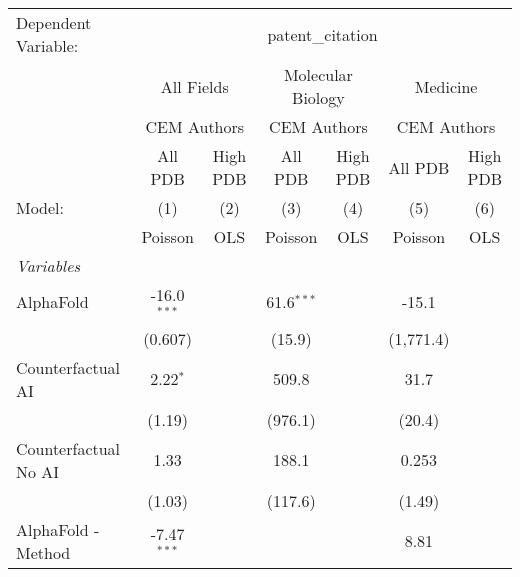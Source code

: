 \begingroup
\centering
\begin{tabular}{lcccccc}
   \tabularnewline \midrule \midrule
   Dependent Variable: & \multicolumn{6}{c}{patent\_citation}\\
 & \multicolumn{2}{c}{All Fields} & \multicolumn{2}{c}{Molecular Biology} & \multicolumn{2}{c}{Medicine} \\
\cmidrule(lr){2-3} \cmidrule(lr){4-5} \cmidrule(lr){6-7}
 & \multicolumn{2}{c}{CEM Authors} & \multicolumn{2}{c}{CEM Authors} & \multicolumn{2}{c}{CEM Authors} \\
\cmidrule(lr){2-3} \cmidrule(lr){4-5} \cmidrule(lr){6-7}
 & \multicolumn{1}{c}{All PDB} & \multicolumn{1}{c}{High PDB} & \multicolumn{1}{c}{All PDB} & \multicolumn{1}{c}{High PDB} & \multicolumn{1}{c}{All PDB} & \multicolumn{1}{c}{High PDB} \\
\cmidrule(lr){2-2} \cmidrule(lr){3-3} \cmidrule(lr){4-4} \cmidrule(lr){5-5} \cmidrule(lr){6-6} \cmidrule(lr){7-7}
   Model:                                                     & (1)           & (2)  & (3)          & (4)  & (5)           & (6)\\  
                                                              &  Poisson      & OLS  & Poisson      & OLS  & Poisson       & OLS\\  
   \midrule
   \emph{Variables}\\
   AlphaFold                                                  & -16.0$^{***}$ &      & 61.6$^{***}$ &      & -15.1         &   \\   
                                                              & (0.607)       &      & (15.9)       &      & (1,771.4)     &   \\   
   Counterfactual AI                                          & 2.22$^{*}$    &      & 509.8        &      & 31.7          &   \\   
                                                              & (1.19)        &      & (976.1)      &      & (20.4)        &   \\   
   Counterfactual No AI                                       & 1.33          &      & 188.1        &      & 0.253         &   \\   
                                                              & (1.03)        &      & (117.6)      &      & (1.49)        &   \\   
   AlphaFold - Method                                         & -7.47$^{***}$ &      &              &      & 8.81          &   \\   

\end{tabular}
